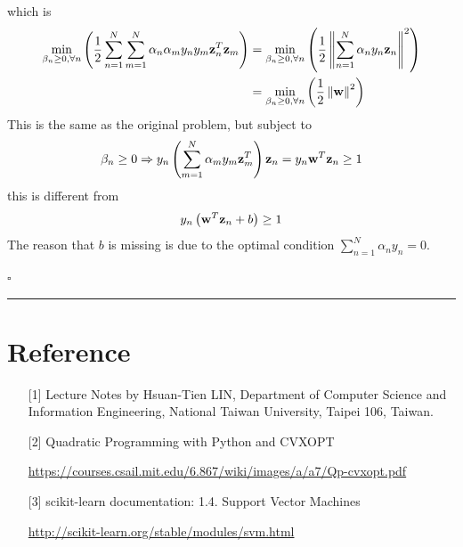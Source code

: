 \documentclass[12pt]{article}
\newcommand*{\QEDB}{\hfill\ensuremath{\square}}
\newcommand{\ParTh}[1]{\left(#1\right)}
\newcommand{\BF}[1]{{\bf#1}}
\newcommand{\VecAbsVal}[1]{\left\|#1\right\|}
\newcommand{\horrule}[1]{\rule{\linewidth}{#1}}
\begin{document}
which is
\begin{align}
\min_{\beta_n\geq0,\forall n}\ParTh{\dfrac{1}{2}\sum_{n=1}^{N}\sum_{m=1}^{N}\alpha_n\alpha_my_ny_m\BF{z}^T_n\BF{z}_m}&=\min_{\beta_n\geq0,\forall n}\ParTh{\dfrac{1}{2}\VecAbsVal{\sum_{n=1}^{N}\alpha_ny_n\BF{z}_n}^2}\\
&=\min_{\beta_n\geq0,\forall n}\ParTh{\dfrac{1}{2}\VecAbsVal{\BF{w}}^2}
\end{align}
This is the same as the original problem, but subject to
\begin{align}
\beta_n\geq0\Rightarrow y_n\ParTh{\sum_{m=1}^{N}\alpha_my_m\BF{z}^T_m}\BF{z}_n=y_n\BF{w}^T\BF{z}_n\geq1
\end{align}
this is different from
\begin{align}
y_n\ParTh{\BF{w}^T\BF{z}_n+b}\geq1
\end{align}
The reason that $b$ is missing is due to the optimal condition $\sum_{n=1}^{N}\alpha_ny_n=0$.

\QEDB

\horrule{0.5pt}

\section*{Reference}

\begin{enumerate}

\item[{[1]}] Lecture Notes by Hsuan-Tien LIN, Department of Computer Science and Information Engineering, National Taiwan University, Taipei 106, Taiwan.

\item[{[2]}] Quadratic Programming with Python and CVXOPT

\url{https://courses.csail.mit.edu/6.867/wiki/images/a/a7/Qp-cvxopt.pdf}

\item[{[3]}] scikit-learn documentation: 1.4. Support Vector Machines

\url{http://scikit-learn.org/stable/modules/svm.html}

\end{enumerate}
\end{document}
